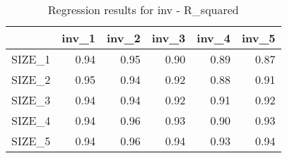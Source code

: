 \begin{table}[ht]
\centering
\caption{Regression results for inv - R_squared} 
\begin{tabular}{rrrrrr}
  \hline
 & inv\_1 & inv\_2 & inv\_3 & inv\_4 & inv\_5 \\ 
  \hline
SIZE\_1 & 0.94 & 0.95 & 0.90 & 0.89 & 0.87 \\ 
  SIZE\_2 & 0.95 & 0.94 & 0.92 & 0.88 & 0.91 \\ 
  SIZE\_3 & 0.94 & 0.94 & 0.92 & 0.91 & 0.92 \\ 
  SIZE\_4 & 0.94 & 0.96 & 0.93 & 0.90 & 0.93 \\ 
  SIZE\_5 & 0.94 & 0.96 & 0.94 & 0.93 & 0.94 \\ 
   \hline
\end{tabular}
\end{table}


